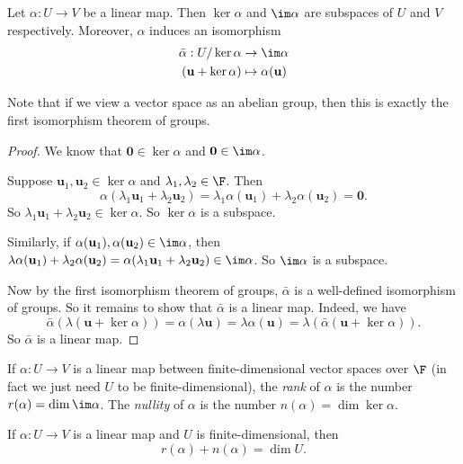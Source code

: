 \documentclass[a4paper]{article}
\begin{document}
\begin{thm}
  Let $\alpha: U\to V$ be a linear map. Then $\ker \alpha$ and $\im \alpha$ are subspaces of $U$ and $V$ respectively. Moreover, $\alpha$ induces an isomorphism
  \begin{align*}
    \bar{\alpha}: U/\ker \alpha &\to \im \alpha\\
    (\mathbf{u} + \ker \alpha) &\mapsto \alpha(\mathbf{u})
  \end{align*}
\end{thm}
Note that if we view a vector space as an abelian group, then this is exactly the first isomorphism theorem of groups.

\begin{proof}
  We know that $\mathbf{0} \in \ker \alpha$ and $\mathbf{0}\in \im \alpha$.

  Suppose $\mathbf{u}_1, \mathbf{u}_2 \in \ker \alpha$ and $\lambda_1, \lambda_2\in \F$. Then
  \[
    \alpha (\lambda_1 \mathbf{u}_1 + \lambda_2 \mathbf{u}_2) = \lambda_1 \alpha(\mathbf{u}_1) + \lambda_2 \alpha(\mathbf{u}_2) = \mathbf{0}.
  \]
  So $\lambda_1 \mathbf{u}_1 + \lambda_2 \mathbf{u}_2 \in \ker \alpha$. So $\ker \alpha$ is a subspace.

  Similarly, if $\alpha(\mathbf{u}_1), \alpha(\mathbf{u}_2) \in \im \alpha$, then $\lambda\alpha(\mathbf{u}_1) + \lambda_2 \alpha(\mathbf{u}_2) = \alpha(\lambda_1 \mathbf{u}_1 + \lambda_2 \mathbf{u}_2) \in \im \alpha$. So $\im \alpha$ is a subspace.

  Now by the first isomorphism theorem of groups, $\bar{\alpha}$ is a well-defined isomorphism of groups. So it remains to show that $\bar{\alpha}$ is a linear map. Indeed, we have
  \[
    \bar{\alpha}(\lambda(\mathbf{u} + \ker \alpha)) = \alpha (\lambda \mathbf{u}) = \lambda \alpha(\mathbf{u}) = \lambda (\bar{\alpha}(\mathbf{u} + \ker \alpha)).
  \]
  So $\bar {\alpha}$ is a linear map.
\end{proof}

\begin{defi}
  If $\alpha: U\to V$ is a linear map between finite-dimensional vector spaces over $\F$ (in fact we just need $U$ to be finite-dimensional), the \emph{rank} of $\alpha$ is the number $r(\alpha) = \dim \im \alpha$. The \emph{nullity} of $\alpha$ is the number $n(\alpha) = \dim \ker \alpha$.
\end{defi}

\begin{cor}
  If $\alpha: U \to V$ is a linear map and $U$ is finite-dimensional, then
  \[
    r(\alpha) + n(\alpha) = \dim U.
  \]
\end{cor}
\end{document}
